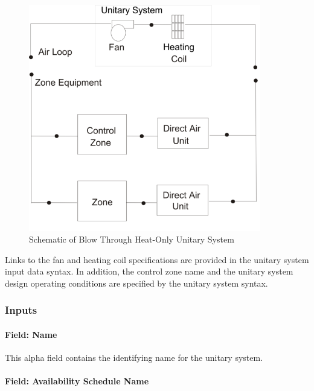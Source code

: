 \begin{figure}[hbtp] %
\centering
\includegraphics[width=0.9\textwidth, height=0.9\textheight, keepaspectratio=true]{media/image303.png}
\caption{Schematic of Blow Through Heat-Only Unitary System \protect \label{fig:schematic-of-blow-through-heat-only-unitary}}
\end{figure}

Links to the fan and heating coil specifications are provided in the unitary system input data syntax. In addition, the control zone name and the unitary system design operating conditions are specified by the unitary system syntax.

\subsubsection{Inputs}\label{inputs-6-030}

\paragraph{Field: Name}\label{field-name-7-023}

This alpha field contains the identifying name for the unitary system.

\paragraph{Field: Availability Schedule Name}\label{field-availability-schedule-name-6-004}

